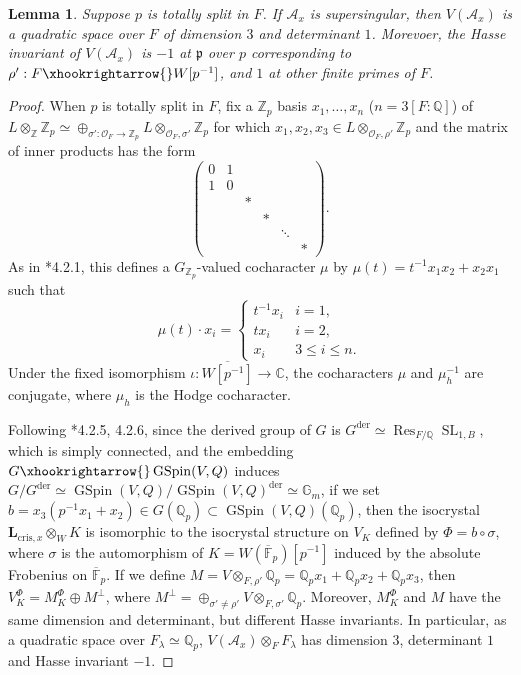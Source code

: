 \documentclass{amsart}
\numberwithin{equation}{subsection}
\numberwithin{theorem}{section}
\newtheorem{lemma}[theorem]{Lemma}
\theoremstyle{definition}
\theoremstyle{remark}
\newcommand{\bC}{\mathbb{C}}
\newcommand{\bF}{\mathbb{F}}
\newcommand{\bQ}{\mathbb{Q}}
\newcommand{\bZ}{\mathbb{Z}}
\newcommand{\cA}{\mathcal{A}}
\newcommand{\fp}{\mathfrak{p}}
\DeclareMathOperator{\SL}{SL}
\DeclareMathOperator{\GSpin}{GSpin}
\DeclareMathOperator{\Res}{Res}
\DeclareMathOperator{\der}{der}
\begin{document}
\begin{lemma}\label{lem:specialendp}
    Suppose $p$ is totally split in $F$.
    If $\cA_x$ is supersingular, then $V(\cA_x)$ is a quadratic space over $F$ of dimension $3$ and determinant $1$. Morevoer, the Hasse invariant of $V(\cA_x)$ is $-1$ at $\fp$ over $p$ corresponding to $\rho': F\xhookrightarrow{}W[p^{-1}]$, and $1$ at other finite primes of $F$. 
\end{lemma}
\begin{proof}
    When $p$ is totally split in $F$, fix a $\bZ_p$ basis $x_1, \dotsc, x_n$ ($n= 3[F:\bQ]$) of $L\otimes_{\bZ}\bZ_p \simeq \oplus_{\sigma':\mathcal{O}_F\to \bZ_p} L\otimes_{\mathcal{O}_F, 
    \sigma'}\bZ_p$ for which $x_1, x_2, x_3\in L\otimes_{\mathcal{O}_F, 
    \rho'}\bZ_p$ and the matrix of inner products has the form \[
    \begin{pmatrix}
    0 & 1 &&&&\\
    1 & 0 &&&&\\
     & & * &&&\\
     &&& * &&\\
     & &&& \ddots&\\
     &&&&& *
    \end{pmatrix}.
    \] 
    As in \cite{MR3705249}*{4.2.1}, this defines a $G_{\bZ_p}$-valued cocharacter $\mu$ by $\mu(t) = t^{-1} x_1x_2 + x_2x_1$ such that \[\mu(t) \cdot x_i = \begin{cases}
        t^{-1}x_i & i = 1,\\ tx_i & i = 2, \\x_i & 3\leq i \leq n. 
    \end{cases}\] 
    Under the fixed isomorphism $\iota: \overline{W[p^{-1}]}\to \bC$, the cocharacters $\mu$ and $\mu_{h}^{-1}$ are conjugate, where $\mu_h$ is the Hodge cocharacter.  %
    
    Following \cite{MR3705249}*{4.2.5, 4.2.6}, since the derived group of $G$ is $G^{\der} \simeq  \Res_{F/\bQ} \SL_{1,B}$, which is simply connected, and the embedding $G\xhookrightarrow{} \GSpin(V, Q)$ induces $G/G^{\der} \simeq \GSpin(V, Q)/\GSpin(V, Q)^{\der}\simeq \mathbb{G}_m$, if we set $b = x_3(p^{-1}x_1+x_2)\in G(\bQ_p)\subset \GSpin(V, Q)(\bQ_p)$, then 
    the isocrystal $\bm{L}_{\mathrm{cris}, x}\otimes_W K$ is isomorphic to the isocrystal structure on $V_K$ defined by $\Phi = b\circ \sigma$, where $\sigma$ is the automorphism of $K=W(\overline{\bF}_p)[p^{-1}]$ induced by the absolute Frobenius on $ \overline{\bF}_p$.  
    If we define $M = V\otimes_{F, \rho'} \bQ_p = \bQ_p x_1+\bQ_p x_2+\bQ_p x_3$, then $V_K^{\Phi} = M_K^{\Phi}\oplus M^{\perp}$, where $M^{\perp} = \oplus_{\sigma'\neq \rho'} V\otimes_{F, \sigma'} \bQ_p$. Moreover, $M_K^{\Phi}$ and $M$ have the same dimension and determinant, but different Hasse invariants. In particular, as a quadratic space over $F_{\lambda}\simeq \bQ_p$, $V(\mathcal{A}_x)\otimes_F F_{\lambda}$ has dimension $3$, determinant $1$ and Hasse invariant $-1$. 
\end{proof}
\end{document}
